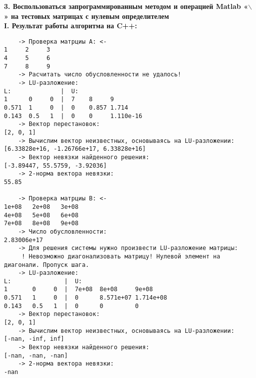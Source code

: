 {\Large{\textbf{3. Воспользоваться запрограммированным методом и операцией Matlab «$\backslash$» на тестовых матрицах с нулевым определителем}}}\\

{\large\bf I. Результат работы алгоритма на C++:}
{\singlespacing
\begin{verbatim}
    -> Проверка матрциы A: <-
1     2     3
4     5     6
7     8     9
    -> Расчитать число обусловленности не удалось!
    -> LU-разложение:
L:              |  U:
1      0     0  |  7    8     9
0.571  1     0  |  0    0.857 1.714
0.143  0.5   1  |  0    0     1.110e-16
    -> Вектор перестановок:
[2, 0, 1]
    -> Вычислим вектор неизвестных, основываясь на LU-разложении:
[6.33828e+16, -1.26766e+17, 6.33828e+16]
    -> Вектор невязки найденного решения:
[-3.89447, 55.5759, -3.92036]
    -> 2-норма вектора невязки:
55.85

    -> Проверка матрциы B: <-
1e+08   2e+08   3e+08
4e+08   5e+08   6e+08
7e+08   8e+08   9e+08
    -> Число обусловленности:
2.83006e+17
    -> Для решения системы нужно произвести LU-разложение матрицы:
     ! Невозможно диагонализовать матрицу! Нулевой элемент на диагонали. Пропуск шага.
    -> LU-разложение:
L:               |  U:
1       0     0  |  7e+08  8e+08     9e+08
0.571   1     0  |  0      8.571e+07 1.714e+08
0.143   0.5   1  |  0      0         0
    -> Вектор перестановок:
[2, 0, 1]
    -> Вычислим вектор неизвестных, основываясь на LU-разложении:
[-nan, -inf, inf]
    -> Вектор невязки найденного решения:
[-nan, -nan, -nan]
    -> 2-норма вектора невязки:
-nan
\end{verbatim}}

